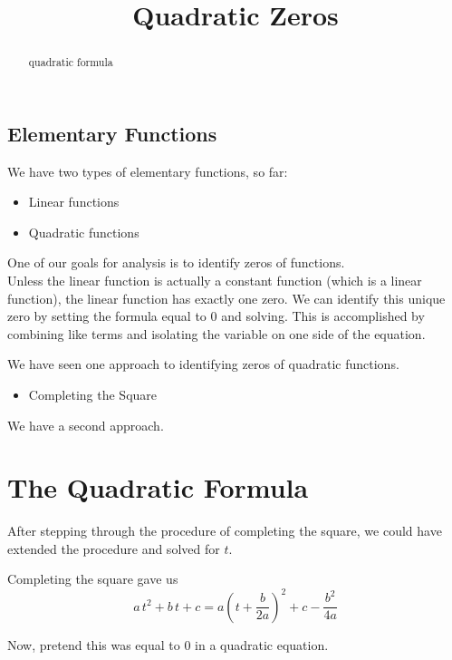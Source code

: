 \documentclass{ximera}
\title{Quadratic Zeros}
\begin{document}
\begin{abstract}
quadratic formula
\end{abstract}
\maketitle



\subsection*{Elementary Functions}

We have two types of elementary functions, so far:

\begin{itemize}
\item Linear functions
\item Quadratic functions
\end{itemize}

One of our goals for analysis is to identify zeros of functions. \\

Unless the linear function is actually a constant function (which is a linear function), the linear function has exactly one zero. We can identify this unique zero by setting the formula equal to $0$ and solving.  This is accomplished by combining like terms and isolating the variable on one side of the equation.

We have seen one approach to identifying zeros of quadratic functions.
\begin{itemize}
\item Completing the Square
\end{itemize}

We have a second approach. \\




\section*{The Quadratic Formula}


After stepping through the procedure of completing the square, we could have extended the procedure and solved for $t$.


Completing the square gave us 
\[ a \, t^2 + b \, t + c = a \left(t + \frac{b}{2 a} \right)^2 + c - \frac{b^2}{4 a} \]


Now, pretend this was equal to $0$ in a quadratic equation.
\end{document}
